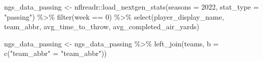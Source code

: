 \documentclass[
  letterpaper,
]{krantz}
\newenvironment{Shaded}{\begin{snugshade}}{\end{snugshade}}
\newcommand{\AttributeTok}[1]{\textcolor[rgb]{0.40,0.45,0.13}{#1}}
\newcommand{\DecValTok}[1]{\textcolor[rgb]{0.68,0.00,0.00}{#1}}
\newcommand{\FunctionTok}[1]{\textcolor[rgb]{0.28,0.35,0.67}{#1}}
\newcommand{\NormalTok}[1]{\textcolor[rgb]{0.00,0.23,0.31}{#1}}
\newcommand{\OtherTok}[1]{\textcolor[rgb]{0.00,0.23,0.31}{#1}}
\newcommand{\SpecialCharTok}[1]{\textcolor[rgb]{0.37,0.37,0.37}{#1}}
\newcommand{\StringTok}[1]{\textcolor[rgb]{0.13,0.47,0.30}{#1}}
\begin{document}
\begin{Shaded}
\begin{Highlighting}[]
\NormalTok{ngs\_data\_passing }\OtherTok{\textless{}{-}}\NormalTok{ nflreadr}\SpecialCharTok{::}\FunctionTok{load\_nextgen\_stats}\NormalTok{(}\AttributeTok{seasons =} \DecValTok{2022}\NormalTok{,}
                                                 \AttributeTok{stat\_type =} \StringTok{"passing"}\NormalTok{) }\SpecialCharTok{\%\textgreater{}\%}
  \FunctionTok{filter}\NormalTok{(week }\SpecialCharTok{==} \DecValTok{0}\NormalTok{) }\SpecialCharTok{\%\textgreater{}\%}
  \FunctionTok{select}\NormalTok{(player\_display\_name, team\_abbr,}
\NormalTok{         avg\_time\_to\_throw, avg\_completed\_air\_yards)}

\NormalTok{ngs\_data\_passing }\OtherTok{\textless{}{-}}\NormalTok{ ngs\_data\_passing }\SpecialCharTok{\%\textgreater{}\%}
  \FunctionTok{left\_join}\NormalTok{(teams, }\AttributeTok{b =} \FunctionTok{c}\NormalTok{(}\StringTok{"team\_abbr"} \OtherTok{=} \StringTok{"team\_abbr"}\NormalTok{))}
\end{Highlighting}
\end{Shaded}
\end{document}
